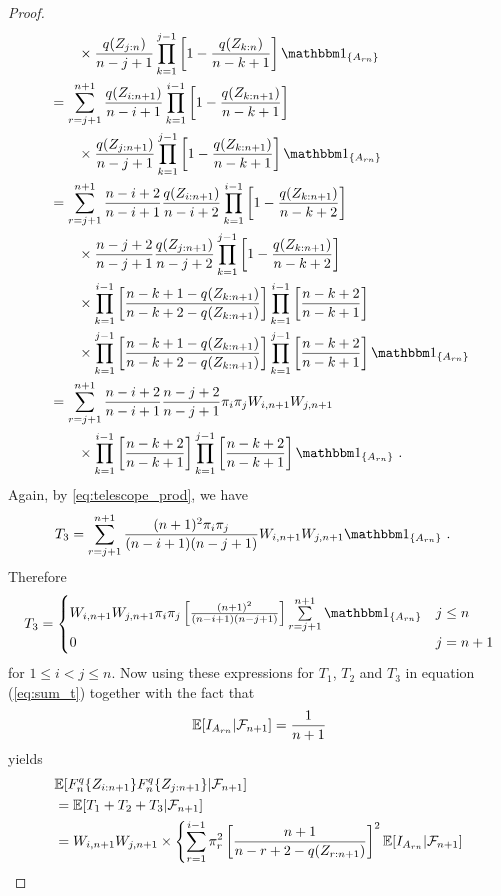 \begin{proof}
\begin{align*}
	&\qquad \times \frac{q(Z_{j:n})}{n-j+1} \prod\limits_{k=1}^{j-1} \left[1-\frac{q(Z_{k:n})}{n-k+1}\right]\I{A_{rn}}\\
	&= \sum\limits_{r=j+1}^{n+1} \frac{q(Z_{i:n+1})}{n-i+1} \prod\limits_{k=1}^{i-1} \left[1-\frac{q(Z_{k:n+1})}{n-k+1}\right]\\
	&\qquad \times \frac{q(Z_{j:n+1})}{n-j+1} \prod\limits_{k=1}^{j-1} \left[1-\frac{q(Z_{k:n+1})}{n-k+1}\right]\I{A_{rn}}\\	
	&= \sum\limits_{r=j+1}^{n+1} \frac{n-i+2}{n-i+1}\frac{q(Z_{i:n+1})}{n-i+2} \prod\limits_{k=1}^{i-1} \left[1-\frac{q(Z_{k:n+1})}{n-k+2}\right]\\
	&\qquad \times \frac{n-j+2}{n-j+1}\frac{q(Z_{j:n+1})}{n-j+2} \prod\limits_{k=1}^{j-1} \left[1-\frac{q(Z_{k:n+1})}{n-k+2}\right]\\	
	&\qquad \times \prod\limits_{k=1}^{i-1} \left[\frac{n-k+1-q(Z_{k:n+1})}{n-k+2-q(Z_{k:n+1})}\right]\prod\limits_{k=1}^{i-1} \left[\frac{n-k+2}{n-k+1}\right]\\
	&\qquad \times \prod\limits_{k=1}^{j-1} \left[\frac{n-k+1-q(Z_{k:n+1})}{n-k+2-q(Z_{k:n+1})}\right]\prod\limits_{k=1}^{j-1} \left[\frac{n-k+2}{n-k+1}\right]\I{A_{rn}}\\
	&= \sum\limits_{r=j+1}^{n+1} \frac{n-i+2}{n-i+1}\frac{n-j+2}{n-j+1}\pi_i\pi_j \wn{i}{n+1}\wn{j}{n+1}\\	
	&\qquad \times \prod\limits_{k=1}^{i-1} \left[\frac{n-k+2}{n-k+1}\right] \prod\limits_{k=1}^{j-1} \left[\frac{n-k+2}{n-k+1}\right]\I{A_{rn}}\mdot
\end{align*}
%
Again, by \eqref{eq:telescope_prod}, we have
\begin{align*}
T_3 &= \sum\limits_{r=j+1}^{n+1} \frac{(n+1)^2\pi_i\pi_j}{(n-i+1)(n-j+1)}\wn{i}{n+1}\wn{j}{n+1}\I{A_{rn}}\mdot
\end{align*}
%
Therefore
\[T_3 = \begin{cases} 
      \wn{i}{n+1}\wn{j}{n+1}\pi_i\pi_j\left[\frac{(n+1)^2}{(n-i+1)(n-j+1)}\right]\sum\limits_{r=j+1}^{n+1}\I{A_{rn}} & j\leq n \\
			0 & j=n+1
   \end{cases}
\]
for $1\leq i<j\leq n$.
%
Now using these expressions for $T_1$, $T_2$ and $T_3$ in equation (\ref{eq:sum_t}) together with the fact that 
$$\mathbb{E}[I_{A_{rn}}|\mathcal{F}_{n+1}] = \frac{1}{n+1}$$
yields
\begin{align*}
	&  \E[F_n^q\{Z_{i:n+1}\}F_n^q\{Z_{j:n+1}\}|\F_{n+1}]\\
	&= \E[T_1 + T_2 + T_3|\F_{n+1}]\\
	&= \wn{i}{n+1}\wn{j}{n+1} \times \left\{\sum\limits_{r=1}^{i-1}\pi_r^2\left[\frac{n+1}{n-r+2-q(Z_{r:n+1})} \right]^2 \E[I_{A_{rn}}|\F_{n+1}]\right.\\

\end{align*}
\end{proof}
